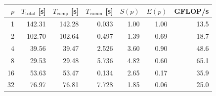 \begin{tabular}{rrrrrrr}
\toprule
$p$ & $T_{\text{total}}$ [s] & $T_{\text{comp}}$ [s] & $T_{\text{comm}}$ [s] & $S(p)$ & $E(p)$ & GFLOP/s \\
\midrule
1 & 142.31 & 142.28 & 0.033 & 1.00 & 1.00 & 13.5 \\
2 & 102.70 & 102.64 & 0.497 & 1.39 & 0.69 & 18.7 \\
4 & 39.56 & 39.47 & 2.526 & 3.60 & 0.90 & 48.6 \\
8 & 29.53 & 29.48 & 5.736 & 4.82 & 0.60 & 65.1 \\
16 & 53.63 & 53.47 & 0.134 & 2.65 & 0.17 & 35.9 \\
32 & 76.97 & 76.81 & 7.728 & 1.85 & 0.06 & 25.0 \\
\bottomrule
\end{tabular}

